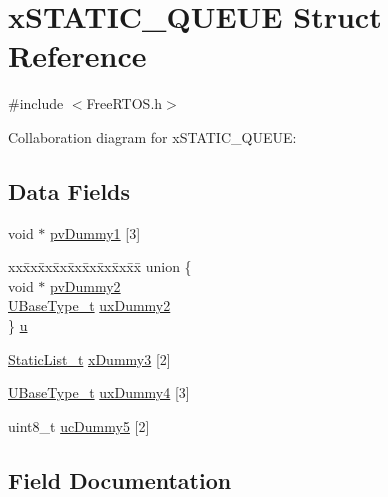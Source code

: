\hypertarget{structx_s_t_a_t_i_c___q_u_e_u_e}{}\section{x\+S\+T\+A\+T\+I\+C\+\_\+\+Q\+U\+E\+UE Struct Reference}
\label{structx_s_t_a_t_i_c___q_u_e_u_e}


{\ttfamily \#include $<$Free\+R\+T\+O\+S.\+h$>$}



Collaboration diagram for x\+S\+T\+A\+T\+I\+C\+\_\+\+Q\+U\+E\+UE\+:
\subsection*{Data Fields}
\begin{DoxyCompactItemize}
\item 
void $\ast$ \hyperlink{structx_s_t_a_t_i_c___q_u_e_u_e_ac563d82b4c6a843835118229de328aa7}{pv\+Dummy1} \mbox{[}3\mbox{]}
\item 
\begin{tabbing}
xx\=xx\=xx\=xx\=xx\=xx\=xx\=xx\=xx\=\kill
union \{\\
\>void $\ast$ \hyperlink{structx_s_t_a_t_i_c___q_u_e_u_e_a44b3b17a1410a0bcec9b416f2bc89a96}{pvDummy2}\\
\>\hyperlink{portmacro_8h_a646f89d4298e4f5afd522202b11cb2e6}{UBaseType\_t} \hyperlink{structx_s_t_a_t_i_c___q_u_e_u_e_a436a95e9535d609e10778297632bf306}{uxDummy2}\\
\} \hyperlink{structx_s_t_a_t_i_c___q_u_e_u_e_aaf47283f9d1be6a327f925481e9615c0}{u}\\

\end{tabbing}\item 
\hyperlink{_free_r_t_o_s_8h_a9735ad9101a2bd25f83a62089a4acee6}{Static\+List\+\_\+t} \hyperlink{structx_s_t_a_t_i_c___q_u_e_u_e_a2ea20ae87a814cd673deba85bbc35e5b}{x\+Dummy3} \mbox{[}2\mbox{]}
\item 
\hyperlink{portmacro_8h_a646f89d4298e4f5afd522202b11cb2e6}{U\+Base\+Type\+\_\+t} \hyperlink{structx_s_t_a_t_i_c___q_u_e_u_e_a8c2bd4532fb12e9c4ca67d2a5b0afc1a}{ux\+Dummy4} \mbox{[}3\mbox{]}
\item 
uint8\+\_\+t \hyperlink{structx_s_t_a_t_i_c___q_u_e_u_e_aad619753f8d76e096e76fbf07502d2c9}{uc\+Dummy5} \mbox{[}2\mbox{]}
\end{DoxyCompactItemize}


\subsection{Field Documentation}
\mbox{\label{structx_s_t_a_t_i_c___q_u_e_u_e_ac563d82b4c6a843835118229de328aa7}} 
